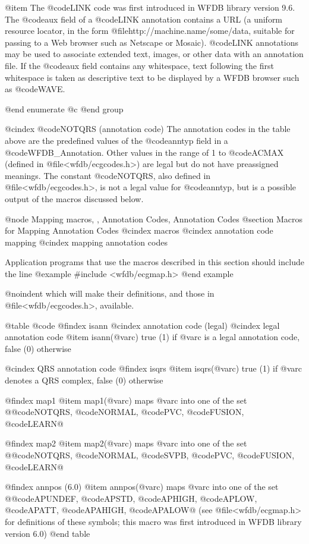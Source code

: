 {{{{{{{{{{{{{{@item
The @code{LINK} code was first introduced in WFDB library version 9.6.  The
@code{aux} field of a @code{LINK} annotation contains a URL (a uniform
resource locator, in the form @file{http://machine.name/some/data},
suitable for passing to a Web browser such as Netscape or Mosaic).  @code{LINK}
annotations may be used to associate extended text, images, or other data with
an annotation file.  If the @code{aux} field contains any whitespace, text
following the first whitespace is taken as descriptive text to be displayed by
a WFDB browser such as @code{WAVE}.

@end enumerate
@c @end group

@cindex @code{NOTQRS} (annotation code)
The annotation codes in the table above are the predefined values of the
@code{anntyp} field in a @code{WFDB_Annotation}.  Other values in the range
of 1 to @code{ACMAX} (defined in @file{<wfdb/ecgcodes.h>}) are legal but
do not have preassigned meanings.  The constant @code{NOTQRS}, also defined in
@file{<wfdb/ecgcodes.h>}, is not a legal value for @code{anntyp}, but is
a possible output of the macros discussed below.

@node    Mapping macros, , Annotation Codes, Annotation Codes
@section Macros for Mapping Annotation Codes
@cindex macros
@cindex annotation code mapping
@cindex mapping annotation codes

Application programs that use the macros described in this section
should include the line
@example
#include <wfdb/ecgmap.h>
@end example

@noindent
which will make their definitions, and those in @file{<wfdb/ecgcodes.h>},
available.

@table @code
@findex isann
@cindex annotation code (legal)
@cindex legal annotation code
@item isann(@var{c})
true (1) if @var{c} is a legal annotation code, false (0)
otherwise

@cindex QRS annotation code
@findex isqrs
@item isqrs(@var{c})
true (1) if @var{c} denotes a QRS complex, false (0) otherwise

@findex map1
@item map1(@var{c})
maps @var{c} into one of the set @{@code{NOTQRS}, @code{NORMAL},
@code{PVC}, @code{FUSION}, @code{LEARN}@}

@findex map2
@item map2(@var{c})
maps @var{c} into one of the set @{@code{NOTQRS}, @code{NORMAL},
@code{SVPB}, @code{PVC}, @code{FUSION}, @code{LEARN}@}

@findex annpos (6.0)
@item annpos(@var{c})
maps @var{c} into one of the set @{@code{APUNDEF}, @code{APSTD},
@code{APHIGH}, @code{APLOW}, @code{APATT}, @code{APAHIGH},
@code{APALOW}@} (see @file{<wfdb/ecgmap.h>} for definitions of these
symbols;  this macro was first introduced in WFDB library version 6.0)
@end table

}}}}}}}}}}}}}}
